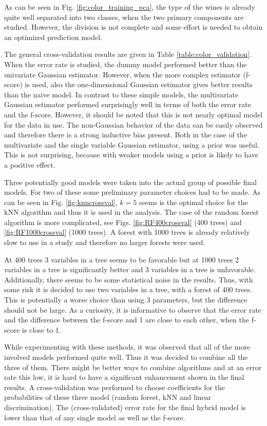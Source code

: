\documentclass[twoside]{article}
\begin{document}
\begin{multicols}{2}
As can be seen in Fig. \ref{fig:color_training_pca}, the type of the wines is already quite well separated into two 
classes, when the two primary components are studied. However, the division is not complete and some effort is needed
to obtain an optimized prediction model.

The general cross-validation results are given in Table \ref{table:color_validation}. When the error
rate is studied, the dummy model performed better than the univariate Gaussian estimator. However, when the more complex estimator (f-score) is used,
also the one-dimensional Gaussian estimator gives better results than the naive model. In contrast to these simple models,
the multivariate Gaussian estimator performed surprisingly well in terms of both the error rate and the f-score.
However, it should be noted that this is not nearly optimal model for the data in use. The non-Gaussian behavior
of the data can be easily observed and therefore there is a strong inductive bias present. Both in the case of the
multivariate and the single variable Gaussian estimator, using a prior was useful. This is not surprising, because
with weaker models using a prior is likely to have a positive effect.

Three potentially good models were taken into the actual group of possible final models. For two of these some preliminary
parameter choices had to be made. As can be seen in Fig. \ref{fig:knncrossval}, $k = 5$ seems is the optimal choice
for the kNN algorithm and thus it is used in the analysis. The case of the random forest algorithm is more complicated, see
Figs. \ref{fig:RF400crossval} (400 trees) and \ref{fig:RF1000crossval} (1000 trees).
A forest with 1000 trees is already relatively slow to use in a study and therefore no larger forests were used. 

At 400
trees 3 variables in a tree seems to be favorable but at 1000 trees 2 variables in a tree is significantly better and 3 variables
in a tree is unfavorable. Additionally, there seems to be some statistical noise in the results. Thus, with some risk it is
decided to use two variables in a tree, with a forest of 400 trees. This is potentially a worse choice than using 3 parameters,
but the difference should not be large. As a curiosity, it is informative to observe that the error rate and the difference between the
f-score and 1 are close to each other, when the f-score is close to 1.

While experimenting with these methods, it was observed that all of the more involved models performed quite well. Thus it was
decided to combine all the three of them. There might be better ways to combine algorithms and at an error rate this low, it is
hard to have a significant enhancement shown in the final results. A cross-validation was performed to choose coefficients for
the probabilities of these three model (random forest, kNN and linear discrimination). The (cross-validated) error rate for the final hybrid model
is lower than that of any single model as well as the f-score.


\end{multicols}
\end{document}
